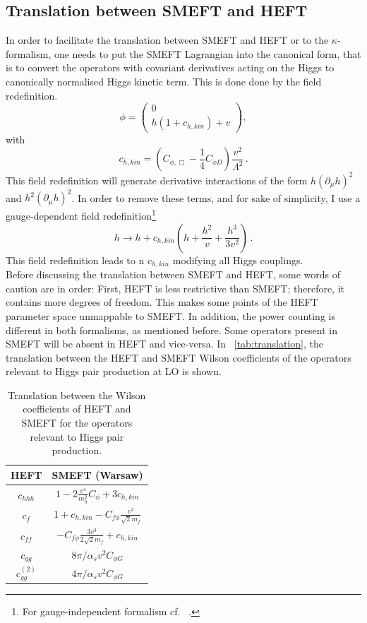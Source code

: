 \subsection{Translation between SMEFT and HEFT }
In order to facilitate the translation between SMEFT and HEFT or to the $\kappa$-formalism, one needs to put the SMEFT Lagrangian into the canonical form, that is to convert the operators with covariant derivatives acting on the Higgs to canonically normalised Higgs kinetic term. This is done done by the field redefinition.
\begin{equation}
	\phi=\left( \begin{array}{c} 0 \\ h(1+c_{h,kin}) + v \end{array} \right),
\end{equation} 
with 
\begin{equation}
	c_{h,kin}=\left(C_{\phi,\Box}-\frac{1}{4}C_{\phi D}\right) \frac{v^2}{\Lambda^2}\,.
\end{equation}
This field redefinition will generate derivative interactions of the form $h(\partial_{\mu}h)^2$ and $h^2(\partial_{\mu}h)^2$. In order to remove these terms, and for sake of simplicity, I use a gauge-dependent field redefinition\footnote{For gauge-independent formalism cf.~ \cite{Hartmann:2015aia}.}
\begin{equation}
	h \to h + c_{h,kin}\left( h +\frac{h^2}{v}+\frac{h^3}{3v^2}\right)\,. \label{fieldref}
\end{equation}
This field redefinition leads to n $c_{h,kin}$ modifying all Higgs couplings. \\
Before discussing the translation between SMEFT and HEFT, some words of caution are in order: First, HEFT is less restrictive than SMEFT; therefore, it contains more degrees of freedom. This makes some points of the HEFT parameter space unmappable to SMEFT. In addition, the power counting is different in both formalisms, as mentioned before. Some operators present in SMEFT will be absent in HEFT and vice-versa.  In ~\autoref{tab:translation}, the translation between the HEFT and SMEFT Wilson coefficients of the operators relevant to Higgs pair production at LO is shown. 
\begin{table}[htb]
	\begin{center}
		\begin{tabular}{ c c }
			\toplinetwo
			HEFT& SMEFT (Warsaw)\\
			\midrule
			$c_{hhh}$&$1-2\frac{v^4}{m_h^2}C_\phi+3c_{h,kin}$ \\
			$c_f$ & $1+c_{h,kin} -C_{f\phi} \frac{v^3}{\sqrt{2} m_f}$\\
			$ c_{ff} $ &$-C_{f\phi} \frac{3 v^3}{2\sqrt{2} m_f} + c_{h,kin}$\\
			$c_{gg}$  & $8\pi/\alpha_s v^2 C_{\phi G}$ \\
			$c_{gg}^{(2)}$  & $4\pi/\alpha_s v^2 C_{\phi G}$ \\
			\bottomrule
		\end{tabular}
	\end{center}
	\caption{Translation between the Wilson coefficients of HEFT and SMEFT for the operators relevant to Higgs pair production. \label{tab:translation}}
\end{table}
